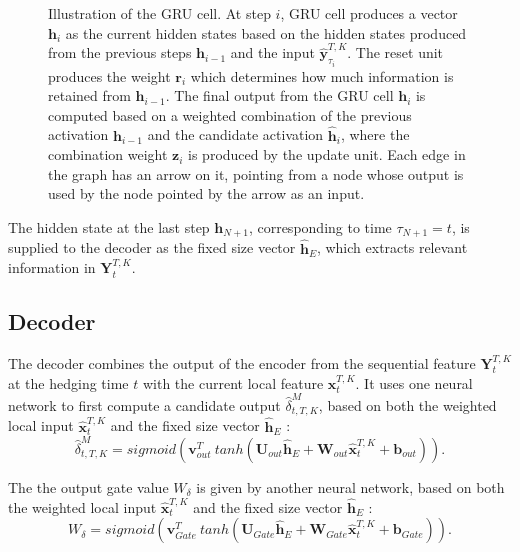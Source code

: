 \documentclass[letterpaper,12pt,titlepage,oneside,final]{book}
\numberwithin{equation}{section}
\theoremstyle{definition}
\newcommand{\vb}{\mathbf{b}}
\newcommand{\vx}{\mathbf{x}}
\newcommand{\vy}{\mathbf{y}}
\newcommand{\vv}{\mathbf{v}}
\newcommand{\vh}{\mathbf{h}}
\newcommand{\vW}{\pmb{W}}
\newcommand{\vU}{\pmb{U}}
\begin{document}
\begin{figure}[htp!]
	\caption{Illustration of the GRU cell. 
		At step $i$,  GRU cell produces a vector  $\vh_{i}$ as the current hidden states based on the hidden states produced from the previous steps $\vh_{i-1}$  and the input $\widehat{\vy}^{T,K}_{\tau_{i}}$. The reset unit produces the weight $\mathbf{r}_i$ which determines how much information is retained from $\vh_{i-1}$.  
		The final output from the GRU cell $\vh_{i}$ is  computed based on a weighted combination of the previous activation $\vh_{i-1}$ and the candidate activation $\widehat{\vh}_i$, where the combination weight $\mathbf{z}_i$ is produced by the update unit. Each edge in the graph has an arrow on it, pointing from a node whose output is used by the node pointed by the arrow as an input.}
	\label{fig:RNN}
\end{figure}
The hidden state at the last step $\vh_{N+1}$, corresponding to time ${\tau_{N+1}}={t}$, is supplied to
the decoder as the fixed size vector $\mathbf{\widehat{h}}_E$, which  extracts relevant information in $\mathbf{Y}_{t}^{T,K}$.
\subsection{Decoder}

The decoder combines the output of the encoder from the sequential feature $\mathbf{Y}_{t}^{T,K}$  at the hedging time $t$ with the current local feature $\mathbf{x}_{t}^{T,K}$.
It uses one neural network to first compute a candidate output  $\widehat{\delta}^M_{t,T,K}$,  based on both the weighted local input  $\widehat{\vx}_{t}^{T,K}$ and the fixed size vector $\mathbf{\widehat{h}}_E$ :
$$
\widehat{\delta}^M_{t,T,K}=sigmoid (\vv^T_{out} \ tanh( \vU_{out} \mathbf{\widehat{h}}_E + \vW_{out} \widehat{\vx}_{t}^{T,K}+ \vb_{out})).
$$

The the output gate value $W_{\delta}$ is given by another neural network, based on both the weighted local input  $\widehat{\vx}_{t}^{T,K}$ and the fixed size vector $\mathbf{\widehat{h}}_E$ :
\begin{equation}\label{WDel}
W_{\delta}=sigmoid (\vv^T_{Gate} \ tanh( \vU_{Gate} \mathbf{\widehat{h}}_E + \vW_{Gate} \widehat{\vx}_{t}^{T,K}+ \vb_{Gate})).
\end{equation}
\end{document}
